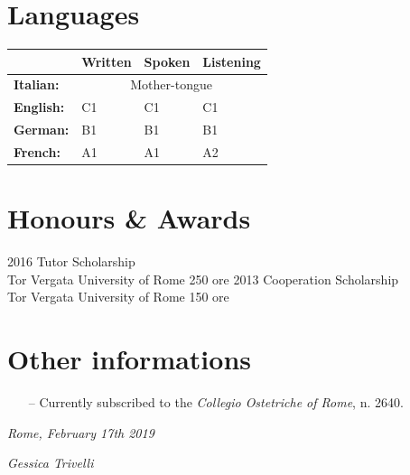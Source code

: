\documentclass[11pt]{friggeri-cv}
\begin{document}
\section{Languages}
\begin{table}[!h]
  \centering
  \renewcommand{\arraystretch}{1.45}
  \begin{tabular}{ p{3cm} p{3cm} p{3cm} p{3cm} }
    \hline
      & \textbf{Written}  
      & \textbf{Spoken} 
      & \textbf{Listening} \\ 
    \hline
    \textbf{Italian:}   
      & \multicolumn{3}{c}{Mother-tongue} \\
    \textbf{English:}
      & C1 
      & C1 
      & C1 \\ 
    \textbf{German:} 
      & B1 
      & B1 
      & B1 \\ 
    \textbf{French:} 
      & A1 
      & A1 
      & A2 \\
    \hline
  \end{tabular}
\end{table}

\newpage
\section{Honours \& Awards}
\begin{entrylist}
  \entry
    {2016}
    {Tutor Scholarship}
    {\\Tor Vergata University of Rome}
    {250 ore}
  \entry
    {2013}
    {Cooperation Scholarship}
    {\\Tor Vergata University of Rome}
    {150 ore}
\end{entrylist}

\section{Other informations}
\begin{itemize}
  \item[--] Currently subscribed to the \textit{Collegio Ostetriche of Rome}, 
  n. 2640.
\end{itemize}


\vspace{7.5cm}
\begin{flushleft}
  \large\emph{Rome, February 17th 2019}
\end{flushleft}
\begin{flushright}
  \large\emph{Gessica Trivelli}
\end{flushright}
\end{document}
